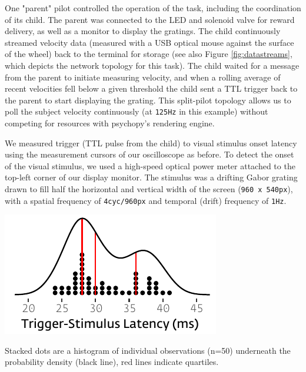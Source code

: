 One "parent" pilot controlled the operation of the task, including the coordination of its child. The parent was connected to the LED and solenoid valve for reward delivery, as well as a monitor to display the gratings. The child continuously streamed velocity data (measured with a USB optical mouse against the surface of the wheel) back to the terminal for storage (see also Figure \ref{fig:datastreams}, which depicts the network topology for this task). The child waited for a message from the parent to initiate measuring velocity, and when a rolling average of recent velocities fell below a given threshold the child sent a TTL trigger back to the parent to start displaying the grating. This split-pilot topology allows us to poll the subject velocity continuously (at \texttt{125Hz} in this example) without competing for resources with psychopy's rendering engine.

We measured trigger (TTL pulse from the child) to visual stimulus onset latency using the measurement cursors of our oscilloscope as before. To detect the onset of the visual stimulus, we used a high-speed optical power meter attached to the top-left corner of our display monitor. The stimulus was a drifting Gabor grating drawn to fill half the horizontal and vertical width of the screen (\texttt{960 x 540px}), with a spatial frequency of \texttt{4cyc/960px} and temporal (drift) frequency of \texttt{1Hz}.

\begin{marginfigure}[1.8cm]
\includegraphics[]{figures/test_6_visual_lags.pdf}
\caption{Stacked dots are a histogram of individual observations (n=50) underneath the probability density (black line), red lines indicate quartiles.}
\label{fig:vidlat}
\end{marginfigure}

